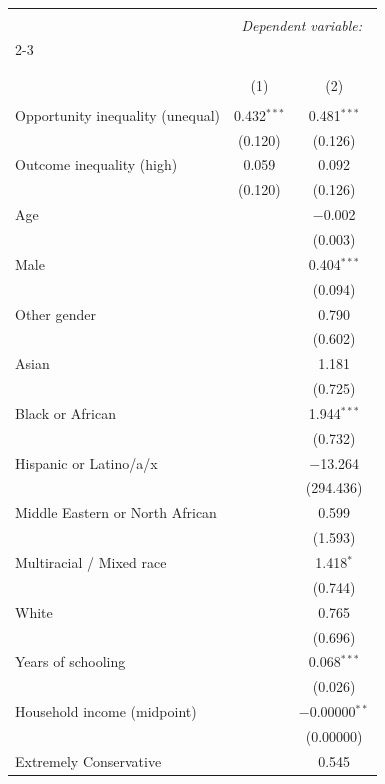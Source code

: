 
\begin{table}[H] \centering 
  \caption{} 
  \label{} 
\tiny 
\begin{tabular}{@{\extracolsep{5pt}}lcc} 
\\[-1.8ex]\hline 
\hline \\[-1.8ex] 
 & \multicolumn{2}{c}{\textit{Dependent variable:}} \\ 
\cline{2-3} 
\\[-1.8ex] & \multicolumn{2}{c}{} \\ 
\\[-1.8ex] & (1) & (2)\\ 
\hline \\[-1.8ex] 
 Opportunity inequality (unequal) & 0.432$^{***}$ & 0.481$^{***}$ \\ 
  & (0.120) & (0.126) \\ 
  Outcome inequality (high) & 0.059 & 0.092 \\ 
  & (0.120) & (0.126) \\ 
  Age &  & $-$0.002 \\ 
  &  & (0.003) \\ 
  Male &  & 0.404$^{***}$ \\ 
  &  & (0.094) \\ 
  Other gender &  & 0.790 \\ 
  &  & (0.602) \\ 
  Asian &  & 1.181 \\ 
  &  & (0.725) \\ 
  Black or African &  & 1.944$^{***}$ \\ 
  &  & (0.732) \\ 
  Hispanic or Latino/a/x &  & $-$13.264 \\ 
  &  & (294.436) \\ 
  Middle Eastern or North African &  & 0.599 \\ 
  &  & (1.593) \\ 
  Multiracial / Mixed race &  & 1.418$^{*}$ \\ 
  &  & (0.744) \\ 
  White &  & 0.765 \\ 
  &  & (0.696) \\ 
  Years of schooling &  & 0.068$^{***}$ \\ 
  &  & (0.026) \\ 
  Household income (midpoint) &  & $-$0.00000$^{**}$ \\ 
  &  & (0.00000) \\ 
  Extremely Conservative &  & 0.545 \\ 

\end{tabular}
\end{table}
